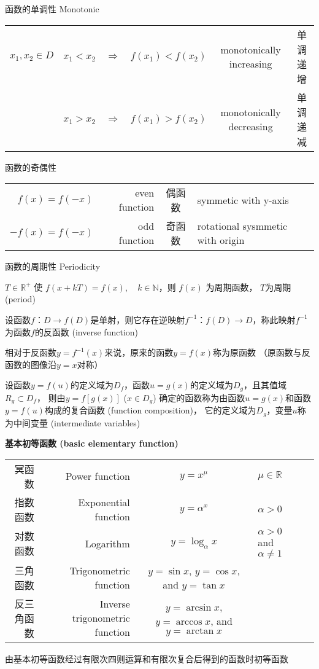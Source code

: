 \documentclass[UTF8]{ctexart}
\begin{document}
\bigskip

函数的单调性 Monotonic

\begin{center}
  \begin{tabular}{cccc}
    $x_1,x_2 \in D$ & $x_1<x_2\quad\Rightarrow\quad f(x_1)<f(x_2)$ & monotonically increasing & 单调递增\\
                    & $x_1>x_2\quad\Rightarrow\quad f(x_1)>f(x_2)$ & monotonically decreasing & 单调递减
  \end{tabular}
\end{center}

\bigskip

函数的奇偶性

\begin{center}
  \begin{tabular}{rrcl}
    $ f(x)=f(-x)$ & even function & 偶函数 & symmetic with y-axis\\
    $-f(x)=f(-x)$ &  odd function & 奇函数 & rotational sysmmetic with origin
  \end{tabular}
\end{center}

\bigskip

函数的周期性 Periodicity

$T\in\mathbb{R}^+$ 使 $f(x+kT)=f(x),\quad k\in\mathbb{N}$，则 $f(x)$ 为周期函数，
$T$为周期 (period)

\bigskip

设函数$f$：$D\to f(D)$是单射，则它存在逆映射$f^{-1}$：$f(D)\to D$，称此映射$f^{-1}$
为函数$f$的反函数 (inverse function)

相对于反函数$y=f^{-1}(x)$来说，原来的函数$y=f(x)$称为原函数
（原函数与反函数的图像沿$y=x$对称）

\bigskip

设函数$y=f(u)$的定义域为$D_f$，函数$u=g(x)$的定义域为$D_g$，且其值域$R_g\subset D_f$，
则由$y=f[g(x)]$ ($x\in D_g$) 确定的函数称为由函数$u=g(x)$和函数$y=f(u)$构成的复合函数 (function composition)，
它的定义域为$D_g$，变量$u$称为中间变量 (intermediate variables)

\bigskip

\textbf{基本初等函数 (basic elementary function)}

\begin{center}
  \begin{tabular}{rrcll}
    冥函数 & Power function & $y=x^\mu$ & $\mu\in\mathbb{R}$\\
    指数函数 & Exponential function & $y=\alpha^x$ & $\alpha > 0$\\
    对数函数 & Logarithm & $y=\log_\alpha x$ & $\alpha>0$ and $\alpha\ne1$\\
    三角函数 & Trigonometric function & $y=\sin{x}$, $y=\cos{x}$, and $y=\tan{x}$\\
    反三角函数 & Inverse trigonometric function & $y=\arcsin{x}$, $y=\arccos{x}$, and $y=\arctan{x}$
  \end{tabular}
\end{center}
由基本初等函数经过有限次四则运算和有限次复合后得到的函数时初等函数
\bigskip
\end{document}
